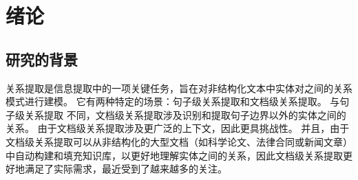 \documentclass[bachelor]{thesis-uestc}
\begin{document}
\thesistableofcontents

\chapter{绪\hspace{6pt}论}

\section{研究的背景}

关系提取是信息提取中的一项关键任务，旨在对非结构化文本中实体对之间的关系模式进行建模。
它有两种特定的场景：句子级关系提取和文档级关系提取。
与句子级关系提取 不同，文档级关系提取涉及识别和提取句子边界以外的实体之间的关系。
由于文档级关系提取涉及更广泛的上下文，因此更具挑战性。
并且，由于文档级关系提取可以从非结构化的大型文档（如科学论文、法律合同或新闻文章） 中自动构建和填充知识库，以更好地理解实体之间的关系，因此文档级关系提取更好地满足了实际需求，最近受到了越来越多的关注。\par

\end{document}
